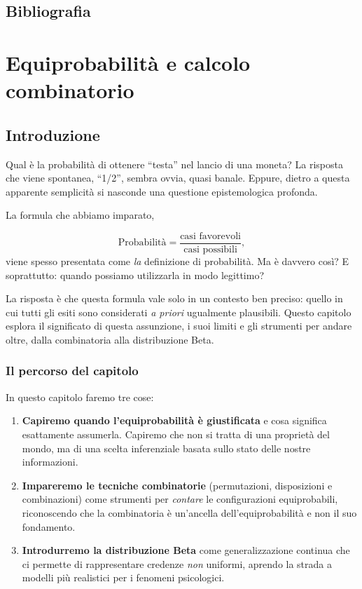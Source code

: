 \documentclass[
  italian,
  letterpaper,
  a4paper,
  11pt,
  open=any]{scrbook}
\theoremstyle{plain}
\theoremstyle{definition}
\theoremstyle{definition}
\theoremstyle{remark}
\begin{document}
\section*{Bibliografia}\label{bibliografia-1}


\chapter{Equiprobabilità e calcolo
combinatorio}\label{sec-equiprobability-combinatorics}

\section*{Introduzione}\label{introduzione-2}


Qual è la probabilità di ottenere ``testa'' nel lancio di una moneta? La
risposta che viene spontanea, ``1/2'', sembra ovvia, quasi banale.
Eppure, dietro a questa apparente semplicità si nasconde una questione
epistemologica profonda.

La formula che abbiamo imparato,

\[
\text{Probabilità} = \frac{\text{casi favorevoli}}{\text{casi possibili}},
\] viene spesso presentata come \emph{la} definizione di probabilità. Ma
è davvero così? E soprattutto: quando possiamo utilizzarla in modo
legittimo?

La risposta è che questa formula vale solo in un contesto ben preciso:
quello in cui tutti gli esiti sono considerati \emph{a priori}
ugualmente plausibili. Questo capitolo esplora il significato di questa
assunzione, i suoi limiti e gli strumenti per andare oltre, dalla
combinatoria alla distribuzione Beta.

\subsection*{Il percorso del capitolo}\label{il-percorso-del-capitolo}

In questo capitolo faremo tre cose:

\begin{enumerate}
\def\labelenumi{\arabic{enumi}.}
\item
  \textbf{Capiremo quando l'equiprobabilità è giustificata} e cosa
  significa esattamente assumerla. Capiremo che non si tratta di una
  proprietà del mondo, ma di una scelta inferenziale basata sullo stato
  delle nostre informazioni.
\item
  \textbf{Impareremo le tecniche combinatorie} (permutazioni,
  disposizioni e combinazioni) come strumenti per \emph{contare} le
  configurazioni equiprobabili, riconoscendo che la combinatoria è
  un'ancella dell'equiprobabilità e non il suo fondamento.
\item
  \textbf{Introdurremo la distribuzione Beta} come generalizzazione
  continua che ci permette di rappresentare credenze \emph{non}
  uniformi, aprendo la strada a modelli più realistici per i fenomeni
  psicologici.
\end{enumerate}
\end{document}
